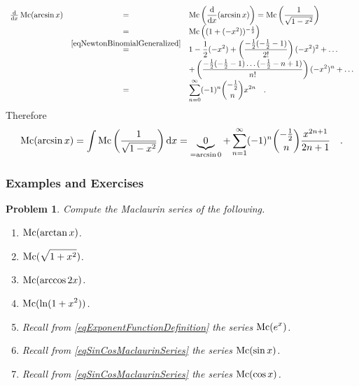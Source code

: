 \documentclass[12pt]{book}
\newtheorem{problem}[theorem]{Problem}
\begin{document}
\[
\begin{array}{rcl}
\frac{{\normalfont \text{d}}}{{\normalfont \text{d}} x}\operatorname{{\normalfont{Mc}}}(\arcsin{x})&=&\displaystyle \operatorname{{\normalfont{Mc}}} \left( \frac{{\normalfont \text{d}}}{{\normalfont \text{d}} x}(\arcsin{x})\right)= \operatorname{{\normalfont{Mc}}} \left( \frac{ 1}{ \sqrt{ 1-x^2 }}\right)\\
&=&
\operatorname{{\normalfont{Mc}}}\left( (1+(-x^2))^{-\frac{1}2}\right)\\
&\stackrel{\eqref{eqNewtonBinomialGeneralized}}{=}&\displaystyle 1-\frac{1}{2 }(- x^{2})+ \left(\frac{-\frac{1}{2}(-\frac{1}2-1)}{2!}\right)(-x^2)^2+ \dots\\
&&\displaystyle + \left(\frac{-\frac{1}{2}(-\frac{1}2-1)\dots (- \frac{1}2 -n+1) }{n!}\right)(-x^2)^n+\dots
\\
&=& \displaystyle\sum\limits_{n=0}^{\infty} (-1)^n \binom{-\frac{1}{2}}{n} x^{ 2n} \quad .
\end{array}
\]
Therefore
\[
\operatorname{{\normalfont{Mc}}}(\arcsin x)=\int \operatorname{{\normalfont{Mc}}}\left(\frac{1}{\sqrt{1-x^2}}\right) {\normalfont \text{d}} x =\underbrace{0}_{=\arcsin 0} +\sum_{n=1}^{\infty} (-1)^n \binom{-\frac{1}{2}}{n} \frac{x^{2n+1}}{2n+1}\quad .
\]

\subsubsection{Examples and Exercises}
\begin{problem}
Compute the Maclaurin series of the following.
\begin{multicols}{2}
\begin{enumerate}
\item $\displaystyle \operatorname{{\normalfont{Mc}}} (\arctan x) $.
\item $\displaystyle \operatorname{{\normalfont{Mc}}} (\sqrt{1+x^2})$.
\item $\displaystyle \operatorname{{\normalfont{Mc}}} (\arccos 2x)$.
\item $\displaystyle \operatorname{{\normalfont{Mc}}}(\ln (1+x^2))$.
\item Recall from \eqref{eqExponentFunctionDefinition} the series $\displaystyle \operatorname{{\normalfont{Mc}}} (e^x)$.
\item Recall from \eqref{eqSinCosMaclaurinSeries} the series $\displaystyle \operatorname{{\normalfont{Mc}}} (\sin x)$.
\item Recall from \eqref{eqSinCosMaclaurinSeries} the series $\displaystyle \operatorname{{\normalfont{Mc}}} (\cos x)$.
\end{enumerate}

\end{multicols}
\end{problem}
\end{document}

